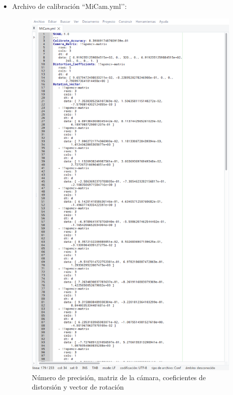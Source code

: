 \begin{itemize}
\begin{itemize}
    \item Archivo de calibración ``MiCam.yml’’: \\
    
    \begin{figure}
    \centering
    \includegraphics[scale = 0.35]{capitulo_04/figuras_dir/par1.jpg}
    \caption{Número de precisión, matriz de la cámara, coeficientes de distorsión y vector de rotación}
    \end{figure}
    

\end{itemize}
\end{itemize}
